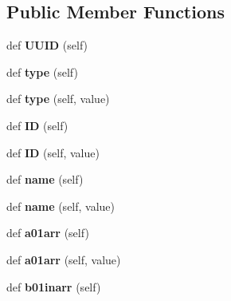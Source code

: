 \subsection*{Public Member Functions}
\begin{DoxyCompactItemize}
\item 
\mbox{\label{class_c_shade_1_1_c_shade_abbcfc1a774079da020e49c42cbadb693}} 
def {\bfseries U\+U\+ID} (self)
\item 
\mbox{\label{class_c_shade_1_1_c_shade_aff464267544e4efc9b770c8320c8f199}} 
def {\bfseries type} (self)
\item 
\mbox{\label{class_c_shade_1_1_c_shade_aca033702f187894894d3102de41d6b99}} 
def {\bfseries type} (self, value)
\item 
\mbox{\label{class_c_shade_1_1_c_shade_adb8818239148d2e5c5833a2b062ee9ad}} 
def {\bfseries ID} (self)
\item 
\mbox{\label{class_c_shade_1_1_c_shade_a0a178fbcae3f6431733dd63ee37ac7bb}} 
def {\bfseries ID} (self, value)
\item 
\mbox{\label{class_c_shade_1_1_c_shade_a5907ca3bbf8e7cd8f40c3007338f6d02}} 
def {\bfseries name} (self)
\item 
\mbox{\label{class_c_shade_1_1_c_shade_a62d212fdcbbcee30e90a64ce349d32f8}} 
def {\bfseries name} (self, value)
\item 
\mbox{\label{class_c_shade_1_1_c_shade_afbd784f4e474831ced93fb7de372fa86}} 
def {\bfseries a01arr} (self)
\item 
\mbox{\label{class_c_shade_1_1_c_shade_a48d0c7289e796d29301c52be0ec20e61}} 
def {\bfseries a01arr} (self, value)
\item 
\mbox{\label{class_c_shade_1_1_c_shade_a1e2fd05578440dee4b4d92ebd044372d}} 
def {\bfseries b01inarr} (self)
\item 
\mbox{\label{class_c_shade_1_1_c_shade_a7ab1eadd41a73dec8eb72f7f5d099c9a}} 

\end{DoxyCompactItemize}
